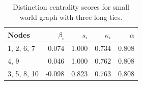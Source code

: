 \begin{table}
\centering
\caption{\label{tab:sw3}Distinction centrality scores for small world graph with three long ties.}
\centering
\begin{tabular}[t]{lrrrr}
\toprule
Nodes & $\beta_i$ & $s_i$ & $\kappa_i$ & $\alpha$\\
\midrule
1, 2, 6, 7 & 0.074 & 1.000 & 0.734 & 0.808\\
4, 9 & 0.046 & 1.000 & 0.762 & 0.808\\
3, 5, 8, 10 & -0.098 & 0.823 & 0.763 & 0.808\\
\bottomrule
\end{tabular}
\end{table}
